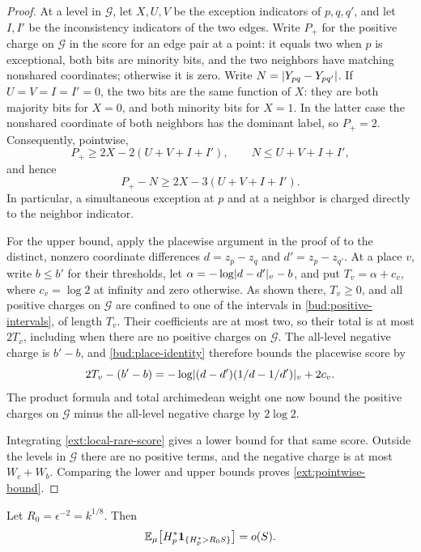 \begin{proof}
At a level in $\mathcal G$, let \(X,U,V\) be the exception indicators of
\(p,q,q'\), and let \(I,I'\) be the inconsistency indicators of the two
edges.  Write \(P_+\) for the positive charge on $\mathcal G$ in the score for an edge pair at a point:
it equals two when \(p\) is exceptional, both bits are minority bits, and
the two neighbors have matching nonshared coordinates; otherwise it is
zero.  Write \(N=\lvert Y_{pq}-Y_{pq'}\rvert\).
If \(U=V=I=I'=0\), the two bits are the same function of \(X\): they are
both majority bits for \(X=0\), and both minority bits for \(X=1\).
In the latter case the nonshared coordinate of both neighbors has the
dominant label, so \(P_+=2\).  Consequently, pointwise,
\[
 P_+\ge 2X-2(U+V+I+I'),\qquad
 N\le U+V+I+I',
\]
and hence
\begin{equation}\label{ext:local-rare-score}
 P_+-N\ge 2X-3(U+V+I+I').
\end{equation}
In particular, a simultaneous exception at \(p\) and at a neighbor is
charged directly to the neighbor indicator.

For the upper bound, apply the placewise argument in the proof of
 to the distinct, nonzero coordinate differences
\(d=z_p-z_q\) and \(d'=z_p-z_{q'}\).
At a place \(v\), write \(b\le b'\) for their thresholds, let
\(\alpha=-\log\lvert d-d'\rvert_v-b\), and put \(T_v=\alpha+c_v\),
where \(c_v=\log2\) at infinity and zero otherwise.
As shown there, \(T_v\ge0\), and all positive charges on $\mathcal G$ are confined to
one of the intervals in \eqref{bud:positive-intervals}, of length
\(T_v\). Their coefficients are at most two, so their total is at
most \(2T_v\), including when there are no positive charges on $\mathcal G$.
The all-level negative charge is \(b'-b\), and
\eqref{bud:place-identity} therefore bounds the placewise score by
\[
 2T_v-(b'-b)
 =-\log\lvert (d-d')(1/d-1/d')\rvert_v+2c_v.
\]
The product formula and total archimedean weight one now bound the positive charges on $\mathcal G$ minus the all-level negative charge by \(2\log2\).

Integrating \eqref{ext:local-rare-score} gives a lower bound for that same
score.  Outside the levels in $\mathcal G$ there are no positive terms, and
the negative charge is at most \(W_c+W_b\).  Comparing the lower and upper
bounds proves \eqref{ext:pointwise-bound}.
\end{proof}

\begin{lemma}\label{ext:tail}
Let \(R_0=\epsilon^{-2}=k^{1/8}\).  Then
\begin{equation}\label{ext:tail-bound}
 \mathbb E_\mu\bigl[H_p^*\mathbf1_{\{H_p^*>R_0S\}}\bigr]=o(S).
\end{equation}
\end{lemma}

